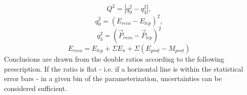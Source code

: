 \documentclass[12pt]{article}
\begin{document}
\begin{equation}
\label{eq:Q2}
Q^2 = |q_0^2 - q_3^2|,
\end{equation}
\begin{equation}
\label{eq:q0}
q_0^2 = (E_{reco} - E_{lep})^2,
\end{equation}
\begin{equation}
\label{eq:q3}
q_3^2 = (\vec{P}_{reco} - \vec{P}_{lep})^2
\end{equation}
\begin{equation}
E_{reco} =E_{lep} + \Sigma E_{\pi} + \Sigma (E_{prot} - M_{prot})
\label{eq:ereco}
\end{equation}
Conclusions are drawn from the double ratios according to the following prescription. If the ratio is flat - i.e. if a horizontal line is within the statistical error bars - in a given bin of the parameterization, uncertainties can be considered sufficient.
 
\end{document}
